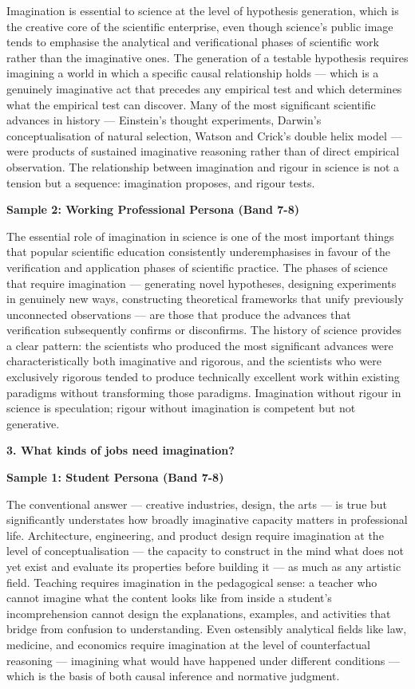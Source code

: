 Imagination is essential to science at the level of hypothesis generation, which is the creative core of the scientific enterprise, even though science's public image tends to emphasise the analytical and verificational phases of scientific work rather than the imaginative ones. The generation of a testable hypothesis requires imagining a world in which a specific causal relationship holds — which is a genuinely imaginative act that precedes any empirical test and which determines what the empirical test can discover. Many of the most significant scientific advances in history — Einstein's thought experiments, Darwin's conceptualisation of natural selection, Watson and Crick's double helix model — were products of sustained imaginative reasoning rather than of direct empirical observation. The relationship between imagination and rigour in science is not a tension but a sequence: imagination proposes, and rigour tests.

\textbf{Sample 2: Working Professional Persona (Band 7-8)}

The essential role of imagination in science is one of the most important things that popular scientific education consistently underemphasises in favour of the verification and application phases of scientific practice. The phases of science that require imagination — generating novel hypotheses, designing experiments in genuinely new ways, constructing theoretical frameworks that unify previously unconnected observations — are those that produce the advances that verification subsequently confirms or disconfirms. The history of science provides a clear pattern: the scientists who produced the most significant advances were characteristically both imaginative and rigorous, and the scientists who were exclusively rigorous tended to produce technically excellent work within existing paradigms without transforming those paradigms. Imagination without rigour in science is speculation; rigour without imagination is competent but not generative.

\separator

\begin{ieltsquestion}
\textbf{3. What kinds of jobs need imagination?}
\end{ieltsquestion}
\textbf{Sample 1: Student Persona (Band 7-8)}

The conventional answer — creative industries, design, the arts — is true but significantly understates how broadly imaginative capacity matters in professional life. Architecture, engineering, and product design require imagination at the level of conceptualisation — the capacity to construct in the mind what does not yet exist and evaluate its properties before building it — as much as any artistic field. Teaching requires imagination in the pedagogical sense: a teacher who cannot imagine what the content looks like from inside a student's incomprehension cannot design the explanations, examples, and activities that bridge from confusion to understanding. Even ostensibly analytical fields like law, medicine, and economics require imagination at the level of counterfactual reasoning — imagining what would have happened under different conditions — which is the basis of both causal inference and normative judgment.

